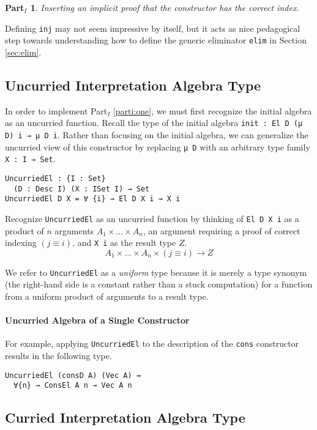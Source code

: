 \documentclass[preprint,nonatbib]{sigplanconf}
\newtheorem{myparti}{Part$_I$}
\newcommand{\refsec}[1]{Section \ref{sec:#1}}
\newcommand{\refparti}[1]{Part$_I$ \ref{parti:#1}}
\begin{document}
\begin{myparti}
\label{parti:two}
Inserting an implicit proof that the constructor has the correct index.
\end{myparti}

Defining {\tt inj} may not seem impressive by itself, but it acts as
nice pedagogical step towards understanding how to define the generic
eliminator {\tt elim} in \refsec{elim}.

\subsection{Uncurried Interpretation Algebra Type}

In order to implement \refparti{one}, we must first recognize the
initial algebra as an uncurried function. Recall the type of the
initial algebra {\tt init : El D (μ D) i → μ D i}. Rather than
focusing on the initial algebra, we can generalize the uncurried view
of this constructor by replacing {\tt μ D} with an arbitrary
type family {\tt X : I → Set}.

\begin{verbatim}
UncurriedEl : {I : Set}
  (D : Desc I) (X : ISet I) → Set
UncurriedEl D X = ∀ {i} → El D X i → X i
\end{verbatim}

Recognize {\tt UncurriedEl} as an uncurried function by thinking of
{\tt El D X i} as a product of $n$ arguments $A_1 × ... × A_n$, an
argument requiring a proof of correct indexing $(j≡i)$, and
{\tt X i} as the result type $Z$.
\[
A_1 × ... × A_n × (j ≡ i) → Z
\]

We refer to {\tt UncurriedEl} as a {\it uniform} type because
it is merely a type synonym (the right-hand side is a constant rather
than a stuck computation) for a function from a uniform product of
arguments to a result type.

\paragraph{Uncurried Algebra of a Single Constructor}

For example, applying {\tt UncurriedEl} to the description of the
{\tt cons} constructor results in the following type.

\begin{verbatim}
UncurriedEl (consD A) (Vec A) ⇝
  ∀{n} → ConsEl A n → Vec A n
\end{verbatim}

\subsection{Curried Interpretation Algebra Type}
\end{document}
